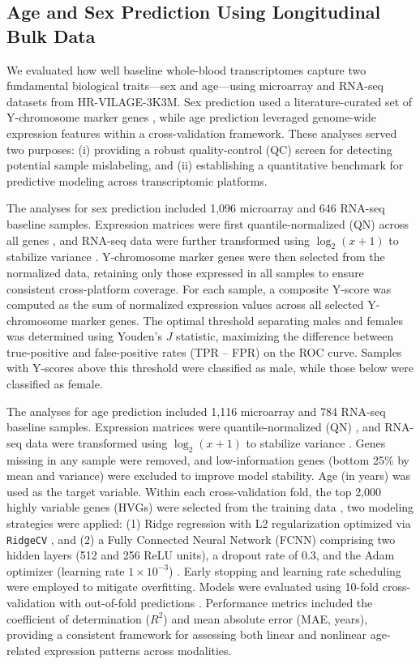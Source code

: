 \documentclass[
  12pt]{article}
\begin{document}
\subsection{Age and Sex Prediction Using Longitudinal Bulk Data}


We evaluated how well baseline whole-blood transcriptomes capture two fundamental biological traits—sex and age—using microarray and RNA-seq datasets from HR-VILAGE-3K3M. Sex prediction used a literature-curated set of Y-chromosome marker genes \citep{ellis2018sex}, while age prediction leveraged genome-wide expression features within a cross-validation framework. These analyses served two purposes: (i) providing a robust quality-control (QC) screen for detecting potential sample mislabeling, and (ii) establishing a quantitative benchmark for predictive modeling across transcriptomic platforms.

The analyses for sex prediction included 1{,}096 microarray and 646 RNA-seq baseline samples. Expression matrices were first quantile-normalized (QN) across all genes \citep{bolstad2003comparison}, and RNA-seq data were further transformed using $\log_2(x+1)$ to stabilize variance \citep{law2014voom}. Y-chromosome marker genes were then selected from the normalized data, retaining only those expressed in all samples to ensure consistent cross-platform coverage. For each sample, a composite Y-score was computed as the sum of normalized expression values across all selected Y-chromosome marker genes. The optimal threshold separating males and females was determined using Youden’s $J$ statistic\citep{youden1950index}, maximizing the difference between true-positive and false-positive rates (TPR – FPR) on the ROC curve. Samples with Y-scores above this threshold were classified as male, while those below were classified as female.

The analyses for age prediction included 1{,}116 microarray and 784 RNA-seq baseline samples. Expression matrices were quantile-normalized (QN) \citep{bolstad2003comparison}, and RNA-seq data were transformed using $\log_2(x+1)$ to stabilize variance \citep{law2014voom}. Genes missing in any sample were removed, and low-information genes (bottom 25\% by mean and variance) were excluded to improve model stability. Age (in years) was used as the target variable. Within each cross-validation fold, the top 2{,}000 highly variable genes (HVGs) were selected from the training data \citep{yip2017evaluation}, two modeling strategies were applied: (1) Ridge regression with L2 regularization optimized via \texttt{RidgeCV} \citep{hoerl1970ridge,scikit-learn}, and (2) a Fully Connected Neural Network (FCNN) comprising two hidden layers (512 and 256 ReLU units), a dropout rate of 0.3, and the Adam optimizer (learning rate $1\times10^{-3}$) \citep{chollet2015keras,kingma2014adam}. Early stopping and learning rate scheduling were employed to mitigate overfitting. Models were evaluated using 10-fold cross-validation with out-of-fold predictions \citep{arlot2010survey}. Performance metrics included the coefficient of determination ($R^2$) and mean absolute error (MAE, years), providing a consistent framework for assessing both linear and nonlinear age-related expression patterns across modalities.
\end{document}
